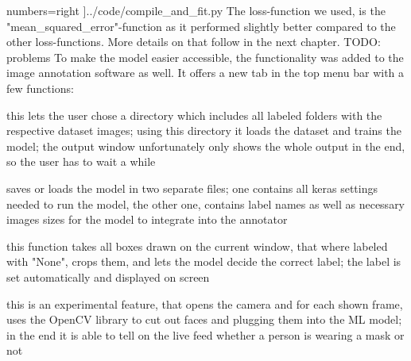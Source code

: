     numbers=right
    ]{../code/compile_and_fit.py}
The loss-function we used, is the "mean\_squared\_error"-function as it performed
slightly better compared to the other loss-functions. More details on that
follow in the next chapter.
\newline
TODO: problems
\newline
To make the model easier accessible, the functionality was added to the image
annotation software as well. It offers a new tab in the top menu bar with a few
functions:
\begin{description}[font=\sffamily\bfseries, leftmargin=1cm, style=nextline]
    \item[train model]
        this lets the user chose a directory which includes all labeled folders
        with the respective dataset images; using this directory it loads the
        dataset and trains the model; the output window unfortunately only shows
        the whole output in the end, so the user has to wait a while
    \item[save/load model]
        saves or loads the model in two separate files; one contains all keras
        settings needed to run the model, the other one, contains label names as
        well as necessary images sizes for the model to integrate into the
        annotator 
    \item[classify current image]
        this function takes all boxes drawn on the current window, that where
        labeled with "None", crops them, and lets the model decide the correct
        label; the label is set automatically and displayed on screen
    \item[live classification]
        this is an experimental feature, that opens the camera and for each
        shown frame, uses the OpenCV library to cut out faces and plugging them
        into the ML model; in the end it is able to tell on the live feed
        whether a person is wearing a mask or not
\end{description}
